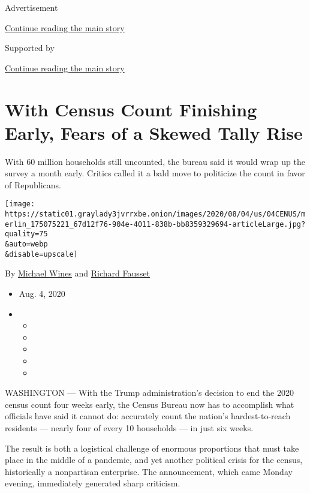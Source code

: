 Advertisement

\protect\hyperlink{after-top}{Continue reading the main story}

Supported by

\protect\hyperlink{after-sponsor}{Continue reading the main story}

\hypertarget{with-census-count-finishing-early-fears-of-a-skewed-tally-rise}{%
\section{With Census Count Finishing Early, Fears of a Skewed Tally
Rise}\label{with-census-count-finishing-early-fears-of-a-skewed-tally-rise}}

With 60 million households still uncounted, the bureau said it would
wrap up the survey a month early. Critics called it a bald move to
politicize the count in favor of Republicans.

\texttt{[image: https://static01.graylady3jvrrxbe.onion/images/2020/08/04/us/04CENUS/merlin\_175075221\_67d12f76-904e-4011-838b-bb8359329694-articleLarge.jpg?quality=75\\\&auto=webp\\\&disable=upscale]}

By \href{https://www.nytimes3xbfgragh.onion/by/michael-wines}{Michael
Wines} and
\href{https://www.nytimes3xbfgragh.onion/by/richard-fausset}{Richard
Fausset}

\begin{itemize}
\item
  Aug. 4, 2020
\item
  \begin{itemize}
  \item
  \item
  \item
  \item
  \item
  \end{itemize}
\end{itemize}

WASHINGTON --- With the Trump administration's decision to end the 2020
census count four weeks early, the Census Bureau now has to accomplish
what officials have said it cannot do: accurately count the nation's
hardest-to-reach residents --- nearly four of every 10 households --- in
just six weeks.

The result is both a logistical challenge of enormous proportions that
must take place in the middle of a pandemic, and yet another political
crisis for the census, historically a nonpartisan enterprise. The
announcement, which came Monday evening, immediately generated sharp
criticism.

